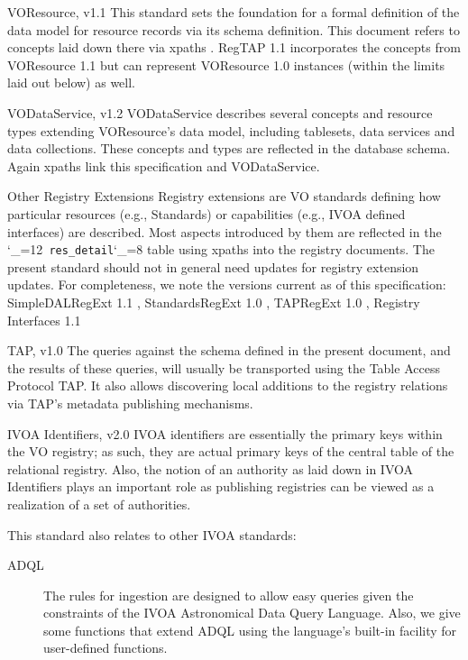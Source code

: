 \documentclass[11pt,a4paper]{ivoa}
\makeatletter
\def\rtent#1{\texttt{\color{rtcolor}\verb|#1|}}
\def\makeunderscoreletter{\catcode`\_=12}
\def\makeunderscoresubscript{\catcode`\_=8}
\def\rtent{\makeunderscoreletter\relax\rt@nt}
\def\rt@nt#1{\texttt{\color{rtcolor} #1}\makeunderscoresubscript{}}
\makeatother
\begin{document}
\begin{bigdescription}
\item[VOResource, v1.1 \citep{2018ivoa.spec.0625P}] This standard
sets the foundation for a formal definition of the data
model for resource records via its schema definition.  This document
refers to concepts laid down there via xpaths \citep{std:XPATH}.  RegTAP
1.1 incorporates the concepts from VOResource 1.1 but can represent
VOResource 1.0 instances (within the limits laid out below) as well.
\item[VODataService, v1.2 \citep{2021ivoa.spec.1102D}] VODataService
de\-scribes several concepts and resource types extending
VOResource's data model, including
tablesets, data services and data
collections.  These concepts and types are reflected in the database
schema.  Again xpaths link this specification and VODataService.
\item[Other Registry Extensions]Registry extensions are VO standards
defining how particular resources (e.g., Standards) or capabilities
(e.g., IVOA defined interfaces) are described.  Most aspects
introduced by them are reflected in the \rtent{res_detail} table using
xpaths into the registry documents.
The present standard should not in general need updates
for registry extension updates.  For completeness, we note the
versions current as of this specification: SimpleDALRegExt 1.1
\citep{2017ivoa.spec.0530P},
StandardsRegExt 1.0 \citep{2012ivoa.spec.0508H}, TAPRegExt 1.0
\citep{2012ivoa.spec.0827D}, Registry Interfaces 1.1
\citep{2018ivoa.spec.0723D}
\item[TAP, v1.0 \citep{2010ivoa.spec.0327D}]The queries against the schema defined in the present document, and the results of
these queries, will usually be transported using the Table Access
Protocol TAP.  It also allows discovering
local additions to the registry relations via TAP's metadata publishing
mechanisms.
\item[IVOA Identifiers, v2.0 \citep{2016ivoa.spec.0523D}]IVOA identifiers are
essentially the primary keys within the VO
registry; as such, they are actual primary keys of the central table of
the relational registry. Also, the notion of an authority as laid down
in IVOA Identifiers plays an important role as publishing registries can
be viewed as a realization of a set of authorities.

\end{bigdescription}

This standard also relates to other IVOA standards:


\begin{description}
\item[ADQL \citep{2023ivoa.spec.1215M}] The rules for ingestion are designed to allow
easy queries given the constraints of the IVOA Astronomical Data Query
Language.  Also, we give some functions that extend ADQL using the
language's built-in facility for user-defined functions.
\end{description}
\end{document}
